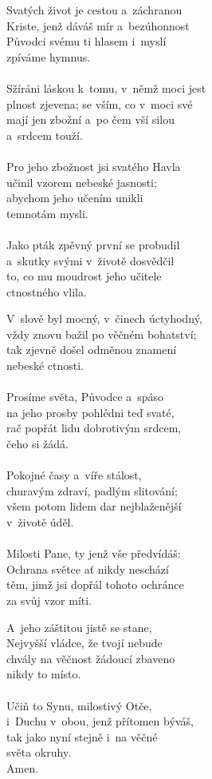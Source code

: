 \begin{translatioMulticol}{3}
Svatých život je cestou a~záchranou\\
Kriste, jenž dáváš mír a~bezúhonnost\\
Původci svému ti hlasem i~myslí\\
zpíváme hymnus.\\
\\
Sžíráni láskou k~tomu, v~němž moci jest\\
plnost zjevena; se vším, co v~moci své\\
mají jen zbožní a~po čem vší silou\\
a~srdcem touží.\\
\\
Pro jeho zbožnost jsi svatého Havla\\
učinil vzorem nebeské jasnosti;\\
abychom jeho učením unikli\\
temnotám mysli. \\
\\
Jako pták zpěvný první se probudil\\
a~skutky svými v~životě dosvědčil\\
to, co mu moudrost jeho učitele\\
ctnostného vlila.\columnbreak

V~slově byl mocný, v~činech úctyhodný,\\
vždy znovu bažil po věčném bohatství;\\
tak zjevně došel odměnou znamení\\
nebeské ctnosti.\\
\\
Prosíme světa, Původce a~spáso\\
na jeho prosby pohlédni teď svaté,\\
rač popřát lidu dobrotivým srdcem,\\
čeho si žádá.\\
\\
Pokojné časy a~víře stálost,\\
churavým zdraví, padlým slitování;\\
všem potom lidem dar nejblaženější\\
v~životě úděl.\\
\\
Milosti Pane, ty jenž vše předvídáš:\\
Ochrana světce ať nikdy neschází\\
těm, jimž jsi dopřál tohoto ochránce\\
za svůj vzor míti.\columnbreak

A~jeho záštitou jistě se stane,\\
Nejvyšší vládce, že tvojí nebude\\
chvály na věčnost žádoucí zbaveno\\
nikdy to místo.\\
\\
Učiň to Synu, milostivý Otče,\\
i~Duchu v~obou, jenž přítomen býváš,\\
tak jako nyní stejně i~na věčné\\
světa okruhy.\\
Amen.
\end{translatioMulticol}
